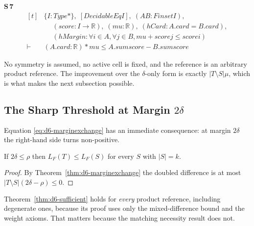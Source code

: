 \noindent\textbf{S\,7}\quad{}
{\footnotesize\[ \begin{aligned}[t]
&\{ \mathit{I} : \mathit{Type}*\},\; [\mathit{DecidableEq} \mathit{I}],\; (\mathit{A} \mathit{B} : \mathit{Finset} \mathit{I}),\\
&\quad \; (\mathit{score} : \mathit{I} \to \mathbb{R} ),\; (\mathit{mu} : \mathbb{R} ),\; (\mathit{hCard} : \mathit{A}.\mathit{card} = \mathit{B}.\mathit{card}),\\
&\quad \; (\mathit{hMargin} : \forall \mathit{i} \in \mathit{A}, \forall \mathit{j} \in \mathit{B}, \mathit{mu} + \mathit{score} \mathit{j} \leq \mathit{score} \mathit{i})\\
\vdash\;&(\mathit{A}.\mathit{card} : \mathbb{R} ) * \mathit{mu} \leq \mathit{A}.\mathit{sum} \mathit{score} - \mathit{B}.\mathit{sum} \mathit{score}
\end{aligned} \]}


No symmetry is assumed, no active cell is fixed, and the reference is an arbitrary product
reference. The improvement over the $\delta$-only form is exactly $|T\setminus S|\mu$, which
is what makes the next subsection possible.

\subsection{The Sharp Threshold at Margin $2\delta$}
\label{sec:d6-threshold}

Equation \eqref{eq:d6-marginexchange} has an immediate consequence: at margin $2\delta$ the
right-hand side turns non-positive.

\begin{theorem}[Sufficiency]
\label{thm:d6-sufficient}
If $2\delta\leq\rho$ then $L_{F}(T)\leq L_{F}(S)$ for every $S$ with $|S|=k$.
\end{theorem}

\begin{proof}
By Theorem~\ref{thm:d6-marginexchange} the doubled difference is at most
$|T\setminus S|(2\delta-\rho)\le0$.
\end{proof}


Theorem~\ref{thm:d6-sufficient} holds for \emph{every} product reference, including degenerate
ones, because its proof uses only the mixed-difference bound and the weight axioms. That
matters because the matching necessity result does not.


